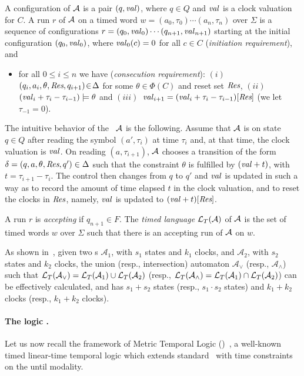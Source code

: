 A configuration of $\mathcal{A}$ is a pair $(q,{\mathit{val}})$, where $q\in Q$ and ${\mathit{val}}$ is a clock valuation for $C$.
A run $r$ of $\mathcal{A}$ on a timed word $w=(a_0,\tau_0)\cdots (a_n,\tau_n)$ over $\Sigma$
is a sequence  of configurations
 $r=(q_0,{\mathit{val}}_0)\cdots (q_{n+1},{\mathit{val}}_{n+1})$ starting at the initial configuration $(q_0,{\mathit{val}}_0)$,
where ${\mathit{val}}_0(c)=0$ for all $c\in C$ (\emph{initiation requirement}), and 
\begin{itemize}
\item for all $0\leq i\leq n$ we have (\emph{consecution requirement}): 
  $(i)$~\mbox{$(q_{i},a_i,\theta,\textit{Res},q_{i+1})\!\in\!\Delta$} for some $\theta\in\Phi(C)$ and reset set $\textit{Res}$, $(ii)$~$({\mathit{val}}_{i} +\tau_i-\tau_{i-1})\models \theta$ and $(iii)$~${\mathit{val}}_{i+1}= ({\mathit{val}}_{i} +\tau_i-\tau_{i-1})[\textit{Res}]$ (we let $\tau_{-1}=0$).
\end{itemize}
The intuitive behavior of the \TA\ $\mathcal{A}$ is the following.
Assume that $\mathcal{A}$ is on state $q\in Q$ after reading the symbol $(a',\tau_i)$ at time $\tau_i$ and, 
at that time, the clock valuation is ${\mathit{val}}$. On reading 
$(a,\tau_{i+1})$, $\mathcal{A}$ chooses a transition of the form $\delta=(q,a,\theta,\textit{Res}, q')\in
\Delta$ such that the constraint $\theta$
is fulfilled by $({\mathit{val}}+t)$, with
$t=\tau_{i+1}-\tau_{i}$. 
The control then changes from $q$ to $q'$ and ${\mathit{val}}$ is updated 
in such a way as to record the amount of time elapsed $t$ in the clock valuation, and to reset the clocks in $\textit{Res}$,
namely, ${\mathit{val}}$ is updated to $({\mathit{val}} +t)[\textit{Res}]$.

A run $r$ is \emph{accepting} if $q_{n+1}\in F$.
The \emph{timed language} ${\mathcal{L}_T}(\mathcal{A})$ of $\mathcal{A}$ is the set of  timed words $w$ over $\Sigma$
such that there is an accepting run of $\mathcal{A}$ on $w$.

As shown in~\cite{ALUR1994183}, given two \TA s $\mathcal{A}_1$, with $s_1$ states and $k_1$ clocks, and $\mathcal{A}_2$, with $s_2$ states and $k_2$ clocks, the union (resp., intersection) automaton $\mathcal{A}_\vee$ (resp., $\mathcal{A}_\wedge$) such that ${\mathcal{L}_T}(\mathcal{A}_\vee)={\mathcal{L}_T}(\mathcal{A}_1)\cup{\mathcal{L}_T}(\mathcal{A}_2)$ (resp., ${\mathcal{L}_T}(\mathcal{A}_\wedge)={\mathcal{L}_T}(\mathcal{A}_1)\cap{\mathcal{L}_T}(\mathcal{A}_2)$) 
can be effectively calculated, and 
has $s_1+s_2$ states (resp., $s_1\cdot s_2$ states) and $k_1+k_2$ clocks (resp., $k_1+k_2$ clocks).

\paragraph{The logic \MTL.}Let us now recall the framework of Metric Temporal Logic (\MTL)~\cite{Koymans90},  a well-known  timed linear-time temporal logic which extends standard \LTL\ with time
constraints on the until modality.


